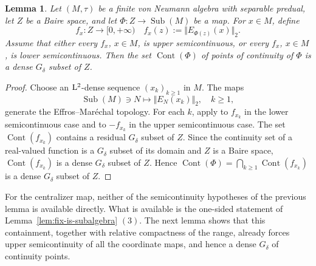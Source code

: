 \documentclass[12pt]{amsart} %
\theoremstyle{plain}
\newtheorem{lemma}[theorem]{Lemma}
\theoremstyle{definition}
\newcommand{\LL}{{\rm L}}
\DeclareMathOperator{\Sub}{Sub}
\begin{document}
\begin{lemma}\label{lem:semicontinuous-coordinate-map}
Let $(M,\tau)$ be a finite von Neumann algebra with separable predual, let
$Z$ be a Baire space, and let $\Phi:Z\to\Sub(M)$ be a map. For $x\in M$, define
$$
f_x:Z\to[0,+\infty)\quad f_x(z):=\Vert E_{\Phi(z)}(x)\Vert_2.
$$
Assume that either every $f_x$, $x\in M$, is upper semicontinuous, or every
$f_x$, $x\in M$, is lower semicontinuous. Then
the set $\operatorname{Cont}(\Phi)$ of points of continuity of $\Phi$ is a dense $G_\delta$ subset of $Z$.
\end{lemma}
\begin{proof}
Choose an $\LL^2$-dense sequence $(x_k)_{k\geq1}$ in $M$. The maps
$$
\Sub(M)\ni N\mapsto\Vert E_N(x_k)\Vert_2,
\quad k\geq1,
$$
generate the Effros--Mar\'echal topology. For each $k$, apply
\cite[Theorem~1]{fort1955category} to $f_{x_k}$ in the lower
semicontinuous case and to $-f_{x_k}$ in the upper semicontinuous case. The
set $\operatorname{Cont}(f_{x_k})$ contains a residual $G_\delta$ subset of
$Z$. Since the continuity set of a real-valued function is a $G_\delta$
subset of its domain and $Z$ is a Baire space,
$\operatorname{Cont}(f_{x_k})$ is a dense $G_\delta$ subset of $Z$. Hence $\operatorname{Cont}(\Phi)=\bigcap_{k\geq1}\operatorname{Cont}(f_{x_k})$
is a dense $G_\delta$ subset of $Z$.
\end{proof}


\noindent For the centralizer map, neither of the semicontinuity hypotheses of the
previous lemma is available directly. What is available is the one-sided
statement of Lemma~\ref{lem:fix-is-subalgebra} $(3)$. The next lemma shows that this
containment, together with relative compactness of the range, already forces
upper semicontinuity of all the coordinate maps, and hence a dense $G_\delta$ of
continuity points.
\medskip
\end{document}
